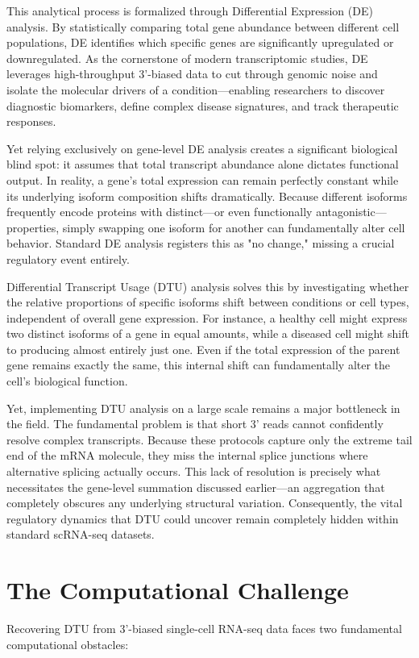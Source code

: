 This analytical process is formalized through Differential Expression (DE) analysis. By statistically comparing total gene abundance between different cell populations, DE identifies which specific genes are significantly upregulated or downregulated. As the cornerstone of modern transcriptomic studies, DE leverages high-throughput 3'-biased data to cut through genomic noise and isolate the molecular drivers of a condition—enabling researchers to discover diagnostic biomarkers, define complex disease signatures, and track therapeutic responses.

Yet relying exclusively on gene-level DE analysis creates a significant biological blind spot: it assumes that total transcript abundance alone dictates functional output. In reality, a gene's total expression can remain perfectly constant while its underlying isoform composition shifts dramatically. Because different isoforms frequently encode proteins with distinct—or even functionally antagonistic—properties, simply swapping one isoform for another can fundamentally alter cell behavior. Standard DE analysis registers this as "no change," missing a crucial regulatory event entirely.

Differential Transcript Usage (DTU) analysis solves this by investigating whether the relative proportions of specific isoforms shift between conditions or cell types, independent of overall gene expression. For instance, a healthy cell might express two distinct isoforms of a gene in equal amounts, while a diseased cell might shift to producing almost entirely just one. Even if the total expression of the parent gene remains exactly the same, this internal shift can fundamentally alter the cell's biological function.

Yet, implementing DTU analysis on a large scale remains a major bottleneck in the field. The fundamental problem is that short 3' reads cannot confidently resolve complex transcripts. Because these protocols capture only the extreme tail end of the mRNA molecule, they miss the internal splice junctions where alternative splicing actually occurs. This lack of resolution is precisely what necessitates the gene-level summation discussed earlier—an aggregation that completely obscures any underlying structural variation. Consequently, the vital regulatory dynamics that DTU could uncover remain completely hidden within standard scRNA-seq datasets.
\setlength{\parskip}{0pt}

\section{The Computational Challenge}
Recovering DTU from 3'-biased single-cell RNA-seq data faces two fundamental computational obstacles:

